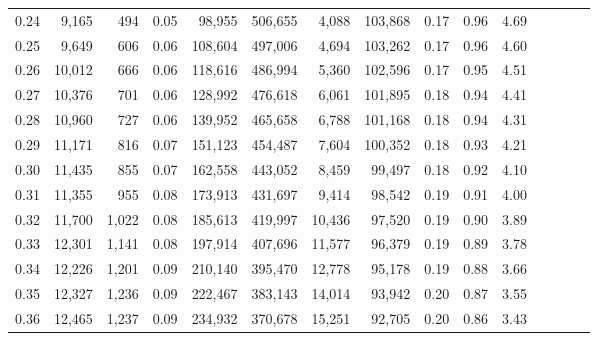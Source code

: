 \begin{tabular}{rrrcrrrrrrrrrrr}
0.24 &   9,165 &    494 &                                       0.05 &   98,955 &  506,655 &    4,088 &  103,868 &  0.17 &  0.96 &                         4.69 \\
0.25 &   9,649 &    606 &                                       0.06 &  108,604 &  497,006 &    4,694 &  103,262 &  0.17 &  0.96 &                         4.60 \\
0.26 &  10,012 &    666 &                                       0.06 &  118,616 &  486,994 &    5,360 &  102,596 &  0.17 &  0.95 &                         4.51 \\
0.27 &  10,376 &    701 &                                       0.06 &  128,992 &  476,618 &    6,061 &  101,895 &  0.18 &  0.94 &                         4.41 \\
0.28 &  10,960 &    727 &                                       0.06 &  139,952 &  465,658 &    6,788 &  101,168 &  0.18 &  0.94 &                         4.31 \\
0.29 &  11,171 &    816 &                                       0.07 &  151,123 &  454,487 &    7,604 &  100,352 &  0.18 &  0.93 &                         4.21 \\
0.30 &  11,435 &    855 &                                       0.07 &  162,558 &  443,052 &    8,459 &   99,497 &  0.18 &  0.92 &                         4.10 \\
0.31 &  11,355 &    955 &                                       0.08 &  173,913 &  431,697 &    9,414 &   98,542 &  0.19 &  0.91 &                         4.00 \\
0.32 &  11,700 &  1,022 &                                       0.08 &  185,613 &  419,997 &   10,436 &   97,520 &  0.19 &  0.90 &                         3.89 \\
0.33 &  12,301 &  1,141 &                                       0.08 &  197,914 &  407,696 &   11,577 &   96,379 &  0.19 &  0.89 &                         3.78 \\
0.34 &  12,226 &  1,201 &                                       0.09 &  210,140 &  395,470 &   12,778 &   95,178 &  0.19 &  0.88 &                         3.66 \\
0.35 &  12,327 &  1,236 &                                       0.09 &  222,467 &  383,143 &   14,014 &   93,942 &  0.20 &  0.87 &                         3.55 \\
0.36 &  12,465 &  1,237 &                                       0.09 &  234,932 &  370,678 &   15,251 &   92,705 &  0.20 &  0.86 &                         3.43 \\

\end{tabular}
